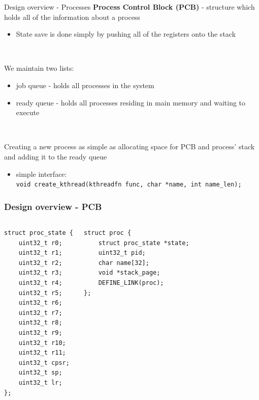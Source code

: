\documentclass[10pt]{beamer}
\newcommand{\code}[1]{\texttt{#1}}
\begin{document}
\begin{frame}{Design overview - Processes}
    \textbf{Process Control Block (PCB)} - structure which holds all of the information about a process
    \begin{itemize}
        \item State save is done simply by pushing all of the registers onto the stack
    \end{itemize} ~

    We maintain two lists:
    \begin{itemize}
        \item job queue - holds all processes in the system
        \item ready queue - holds all processes residing in main memory and waiting to execute
    \end{itemize} ~

    Creating a new process as simple as allocating space for PCB and process' stack and adding it to the ready queue
    \begin{itemize}
        \item simple interface: \\
        \code{void create\_kthread(kthreadfn func, char *name, int name\_len);}
    \end{itemize}
\end{frame}

\begin{frame}[fragile]
    \frametitle{Design overview - PCB}

    \begin{columns}
        \lstset{language=C,basicstyle=\ttfamily}
        \begin{lstlisting}
struct proc_state {
    uint32_t r0;
    uint32_t r1;
    uint32_t r2;
    uint32_t r3;
    uint32_t r4;
    uint32_t r5;
    uint32_t r6;
    uint32_t r7;
    uint32_t r8;
    uint32_t r9;
    uint32_t r10;
    uint32_t r11;
    uint32_t cpsr;
    uint32_t sp;
    uint32_t lr;
};
        \end{lstlisting}

        \lstset{language=C,basicstyle=\ttfamily}
        \begin{lstlisting}
struct proc {
    struct proc_state *state;
    uint32_t pid;
    char name[32];
    void *stack_page;
    DEFINE_LINK(proc);
};
        \end{lstlisting}
    \end{columns}

\end{frame}
\end{document}

